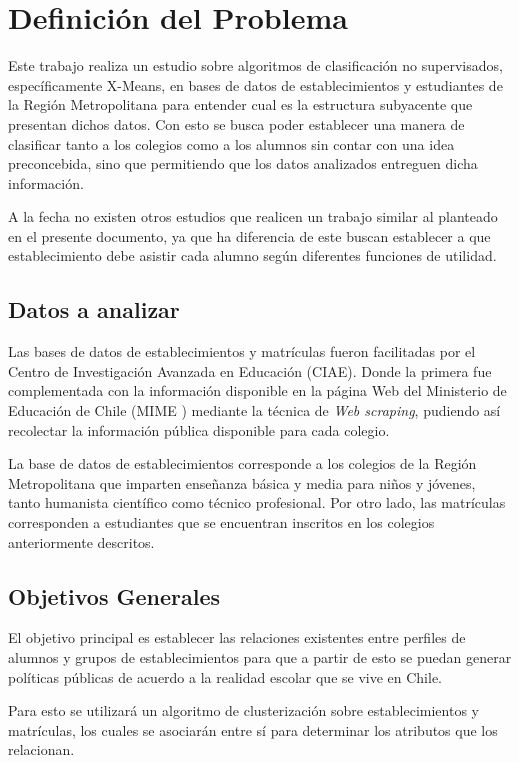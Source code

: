 \chapter{Definici\'on del Problema}

Este trabajo realiza un estudio sobre algoritmos de clasificación no supervisados, específicamente X-Means, en bases de datos de establecimientos y estudiantes de la Región Metropolitana para entender cual es la estructura subyacente que presentan dichos datos. Con esto se busca poder establecer una manera de clasificar tanto a los colegios como a los alumnos sin contar con una idea preconcebida, sino que permitiendo que los datos analizados entreguen dicha información.

A la fecha no existen otros estudios que realicen un trabajo similar al planteado en el presente documento, ya que ha diferencia de este buscan establecer a que establecimiento debe asistir cada alumno según diferentes funciones de utilidad.


\section{Datos a analizar}

Las bases de datos de establecimientos y matrículas fueron facilitadas por el Centro de Investigación Avanzada en Educación (CIAE). Donde la primera fue complementada con la información disponible en la página Web del Ministerio de Educación de Chile (MIME \cite{MIME}) mediante la técnica de \textit{Web scraping}, pudiendo así recolectar la información pública disponible para cada colegio.

La base de datos de establecimientos corresponde a los colegios de la Región Metropolitana que imparten enseñanza básica y media para niños y jóvenes, tanto humanista científico como técnico profesional. Por otro lado, las matrículas corresponden a estudiantes que se encuentran inscritos en los colegios anteriormente descritos. 

\section{Objetivos Generales}

El objetivo principal es establecer las relaciones existentes entre perfiles de alumnos y grupos de establecimientos para que a partir de esto se puedan generar políticas públicas de acuerdo a la realidad escolar que se vive en Chile.

Para esto se utilizará un algoritmo de clusterización sobre establecimientos y matrículas, los cuales se asociarán entre sí para determinar los atributos que los relacionan.

